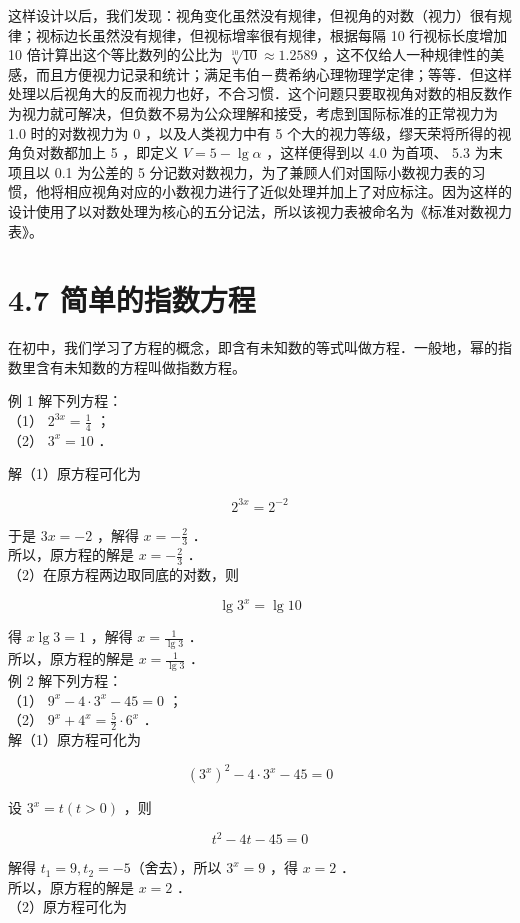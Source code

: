 \documentclass[10pt]{article}
\begin{document}
这样设计以后，我们发现：视角变化虽然没有规律，但视角的对数（视力）很有规律；视标边长虽然没有规律，但视标增率很有规律，根据每隔 10 行视标长度增加 10 倍计算出这个等比数列的公比为 \(\sqrt[10]{10} \approx 1.2589\) ，这不仅给人一种规律性的美感，而且方便视力记录和统计；满足韦伯－费希纳心理物理学定律；等等．但这样处理以后视角大的反而视力也好，不合习惯．这个问题只要取视角对数的相反数作为视力就可解决，但负数不易为公众理解和接受，考虑到国际标准的正常视力为 1.0 时的对数视力为 0 ，以及人类视力中有 5 个大的视力等级，缪天荣将所得的视角负对数都加上 5 ，即定义 \(V=5-\lg \alpha\) ，这样便得到以 4.0 为首项、 5.3 为末项且以 0.1 为公差的 5 分记数对数视力，为了兼顾人们对国际小数视力表的习惯，他将相应视角对应的小数视力进行了近似处理并加上了对应标注。因为这样的设计使用了以对数处理为核心的五分记法，所以该视力表被命名为《标准对数视力表》。

\section*{4.7 简单的指数方程}
在初中，我们学习了方程的概念，即含有未知数的等式叫做方程．一般地，幂的指数里含有未知数的方程叫做指数方程。

例 1 解下列方程：\\
（1） \(2^{3 x}=\frac{1}{4}\) ；\\
（2） \(3^{x}=10\) ．

解（1）原方程可化为

\[
2^{3 x}=2^{-2}
\]

于是 \(3 x=-2\) ，解得 \(x=-\frac{2}{3}\) ．\\
所以，原方程的解是 \(x=-\frac{2}{3}\) ．\\
（2）在原方程两边取同底的对数，则

\[
\lg 3^{x}=\lg 10
\]

得 \(x \lg 3=1\) ，解得 \(x=\frac{1}{\lg 3}\) ．\\
所以，原方程的解是 \(x=\frac{1}{\lg 3}\) ．\\
例 2 解下列方程：\\
（1） \(9^{x}-4 \cdot 3^{x}-45=0\) ；\\
（2） \(9^{x}+4^{x}=\frac{5}{2} \cdot 6^{x}\) ．\\
解（1）原方程可化为

\[
\left(3^{x}\right)^{2}-4 \cdot 3^{x}-45=0
\]

设 \(3^{x}=t(t>0)\) ，则

\[
t^{2}-4 t-45=0
\]

解得 \(t_{1}=9, t_{2}=-5\)（舍去），所以 \(3^{x}=9\) ，得 \(x=2\) ．\\
所以，原方程的解是 \(x=2\) ．\\
（2）原方程可化为
\end{document}
